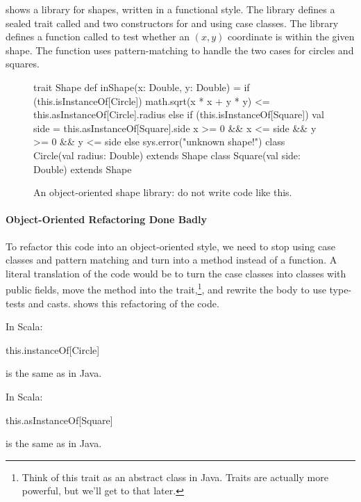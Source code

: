 \documentclass[9pt]{extbook}
\begin{document}
 shows a library for shapes, written in a functional style.
The library defines a sealed trait called  and two
constructors for  and  using
case classes. The library defines a function called 
to test whether an $(x,y)$ coordinate is within the given shape. The function
uses pattern-matching to handle the two cases for circles and squares.

\begin{figure}
\begin{scalacode}
trait Shape {
  def inShape(x: Double, y: Double) = {
    if (this.isInstanceOf[Circle]) {
      math.sqrt(x * x + y * y) <= this.asInstanceOf[Circle].radius
    }
    else if (this.isInstanceOf[Square]) {
      val side = this.asInstanceOf[Square].side
      x >= 0 && x <= side && y >= 0 && y <= side
    }
    else {
      sys.error("unknown shape!")
    }
  }
}
class Circle(val radius: Double) extends Shape
class Square(val side: Double) extends Shape
\end{scalacode}
\caption{An object-oriented shape library: do not write code like this.}
\label{jshapesbad}
\end{figure}

\paragraph{Object-Oriented Refactoring Done Badly} To refactor this code into an
object-oriented style, we need to stop using case classes and pattern matching
and turn  into a method instead of a function.
A literal translation of the code would be to turn the case classes
into classes with public fields, move the method into the 
trait,\footnote{Think of this trait as an abstract class in Java. Traits are actually more powerful, but we'll get to that later.}, and rewrite the body to
use type-tests and casts.
  shows this refactoring of the
code.

\begin{notation}
In Scala:
\begin{scalacode}
this.instanceOf[Circle]
\end{scalacode}
is the same as
 in Java.

In Scala:
\begin{scalacode}
this.asInstanceOf[Square]
\end{scalacode}
is the same as  in Java.
\end{notation}
\end{document}
